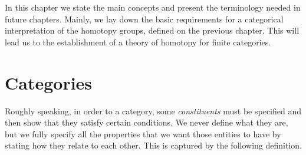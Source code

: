 In this chapter we state the main concepts and present the terminology needed in  future chapters. Mainly, we lay down  the basic requirements for a categorical interpretation of the  homotopy groups, defined on the previous chapter. This will lead us to the establishment of a theory of homotopy for finite categories.


\section{Categories}


Roughly speaking, in order to  a category, some \textit{constituents} must be specified and then show that they satisfy certain conditions. We never define what they are, but we fully specify all the properties that we want those entities to have by stating how they relate to each other. This is captured by the following definition.



